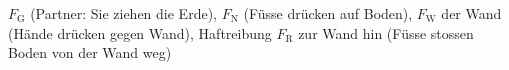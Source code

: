 $F_\text{G}$ (Partner: Sie ziehen die Erde), $F_\text{N}$ (Füsse drücken auf Boden), $F_\text{W}$ der Wand (Hände drücken gegen Wand), Haftreibung $F_\text{R}$ zur Wand hin (Füsse stossen Boden von der Wand weg)
